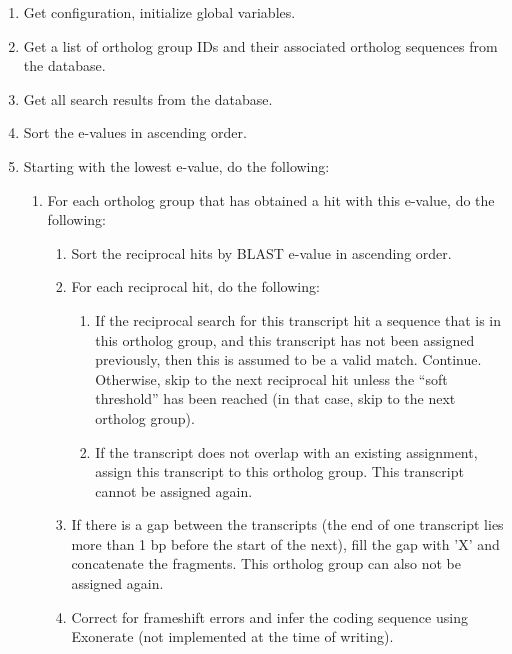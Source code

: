\begin{enumerate}
	\item Get configuration, initialize global variables.
	\item Get a list of ortholog group IDs and their associated ortholog sequences
		from the database.
	\item Get all search results from the database.
	\item Sort the  e-values in ascending order.
	\item Starting with the lowest  e-value, do the following:
	\begin{enumerate}
		\item For each ortholog group that has obtained a  hit with this
			e-value, do the following:
			\begin{enumerate}
				\item Sort the reciprocal hits by BLAST e-value in ascending order.
				\item For each reciprocal hit, do the following:
				\begin{enumerate}
					\item If the reciprocal search for this transcript hit a sequence that
						is in this ortholog group, and this transcript has not been assigned
						previously, then this is assumed to be a valid match. Continue.
						Otherwise, skip to the next reciprocal hit unless the ``soft
						threshold'' has been reached (in that case, skip to the next
						ortholog group).
					\item If the transcript does not overlap with an existing assignment,
						assign this transcript to this ortholog group. This transcript cannot
						be assigned again. 
				\end{enumerate}
			\item If there is a gap between the transcripts (the end of one transcript
				lies more than 1 bp before the start of the next), fill the gap with
				'X' and concatenate the fragments. This ortholog group can also not be
				assigned again.
			\item Correct for frameshift errors and infer the coding sequence using
				Exonerate (not implemented at the time of writing).
		\end{enumerate}
	\end{enumerate}
\end{enumerate}

